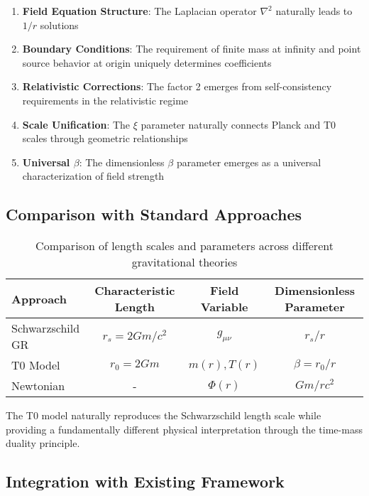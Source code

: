 \documentclass[12pt,a4paper]{article}
\begin{document}
\begin{enumerate}
	\item \textbf{Field Equation Structure}: The Laplacian operator $\nabla^2$ naturally leads to $1/r$ solutions
	
	\item \textbf{Boundary Conditions}: The requirement of finite mass at infinity and point source behavior at origin uniquely determines coefficients
	
	\item \textbf{Relativistic Corrections}: The factor 2 emerges from self-consistency requirements in the relativistic regime
	
	\item \textbf{Scale Unification}: The $\xi$ parameter naturally connects Planck and T0 scales through geometric relationships
	
	\item \textbf{Universal $\beta$}: The dimensionless $\beta$ parameter emerges as a universal characterization of field strength
\end{enumerate}

\subsection{Comparison with Standard Approaches}
\label{subsec:comparison_standard}

\begin{table}[htbp]
	\centering
	\begin{tabular}{|l|c|c|c|}
		\hline
		\textbf{Approach} & \textbf{Characteristic Length} & \textbf{Field Variable} & \textbf{Dimensionless Parameter} \\
		\hline
		Schwarzschild GR & $r_s = 2Gm/c^2$ & $g_{\mu\nu}$ & $r_s/r$ \\
		\hline
		T0 Model & $r_0 = 2Gm$ & $m(r), T(r)$ & $\beta = r_0/r$ \\
		\hline
		Newtonian & - & $\Phi(r)$ & $Gm/rc^2$ \\
		\hline
	\end{tabular}
	\caption{Comparison of length scales and parameters across different gravitational theories}
	\label{tab:comparison_approaches}
\end{table}

The T0 model naturally reproduces the Schwarzschild length scale while providing a fundamentally different physical interpretation through the time-mass duality principle.

\subsection{Integration with Existing Framework}
\label{subsec:integration_existing}
\end{document}
